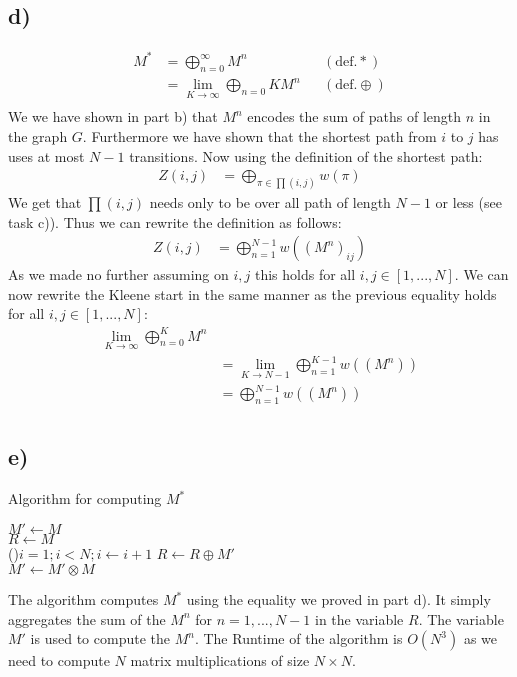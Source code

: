 \documentclass[a4paper,12pt]{ETHexercise}
\begin{document}
\subsection*{d)}
\begin{align}
    M^* &= \bigoplus^{\infty}_{n=0} M^n &&(\text{def.} *)\\
    &= \lim_{K \rightarrow \infty} \bigoplus_{n=0}{K} M^n &&(\text{def.} \oplus)\\
\end{align}
We we have shown in part b) that $M^n$ encodes the sum of paths of length $n$ in the graph $G$. Furthermore we have shown that the shortest path from $i$ to $j$ has uses at most $N-1$ transitions.
Now using the definition of the shortest path:
\begin{align}
    Z(i,j) &= \bigoplus_{\pi \in \prod(i,j)} w(\pi) \nonumber
\end{align}
We get that $\prod(i,j)$ needs only to be over all path of length $N-1$ or less (see task c)). Thus we can rewrite
the definition as follows:
\begin{align*}
    Z(i,j) &= \bigoplus_{n = 1}^{N-1} w((M^n)_{ij})
\end{align*}
As we made no further assuming on $i,j$ this holds for all $i,j \in [1,...,N]$.
We can now rewrite the Kleene start in the same manner as the previous equality holds for all $i,j \in [1,...,N]$:
\begin{align}
       \lim_{K \rightarrow \infty} \bigoplus_{n=0}^{K} M^n \\
    &= \lim_{K \rightarrow N-1} \bigoplus_{n = 1}^{K-1} w((M^n))\\
    &= \bigoplus_{n = 1}^{N-1} w((M^n))\\
\end{align}

\subsection*{e)}
\begin{algorithm}
    \SetAlgoLined
    \caption[]{Algorithm for computing $M^*$}
    $M' \gets M$\\
    $R  \gets M$\\
    \For(){$i = 1; i < N; i\gets i+1$}{
        $R \gets R \oplus M'$\\
        $M' \gets M' \otimes M$
    }
\end{algorithm}
The algorithm computes $M^*$ using the equality we proved in part d). It simply aggregates the sum of the $M^n$ for $n = 1,...,N-1$ in the variable $R$. The variable $M'$ is used to compute the $M^n$.
The Runtime of the algorithm is $O(N^3)$ as we need to compute $N$ matrix multiplications of size $N \times N$.
\end{document}
